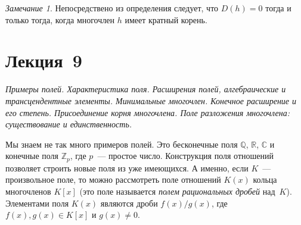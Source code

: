 \documentclass[a4paper,10pt]{amsart}
\def\CC{{\mathbb C}}%
\def\ZZ{{\mathbb Z}}%
\def\RR{{\mathbb R}}%
\def\QQ{{\mathbb Q}}%
\theoremstyle{definition}
\theoremstyle{remark}
\newtheorem{remark}{Замечание}
\newtheorem{example}{Пример}
\begin{document}
\begin{remark}
	Непосредствено из определения следует, что $D(h) = 0$ тогда и только
	тогда, когда многочлен $h$ имеет кратный корень.
\end{remark}
%
%
%
%
%


\newpage

\section*{Лекция~9}

\medskip

{\it Примеры полей. Характеристика поля. Расширения полей,
	алгебраические и трансцендентные элементы. Минимальные многочлен.
	Конечное расширение и его степень. Присоединение корня многочлена.
	Поле разложения многочлена: существование и единственность.}

\medskip

Мы знаем не так много примеров полей. Это бесконечные поля $\QQ$,
$\RR$, $\CC$ и конечные поля $\ZZ_p$, где $p$~--- простое число.
Конструкция поля отношений позволяет строить новые поля из уже
имеющихся. А именно, если $K$~--- произвольное поле, то можно
рассмотреть поле отношений $K(x)$ кольца многочленов $K[x]$ (это
поле называется \textit{полем рациональных дробей} над~$K$).
Элементами поля $K(x)$ являются дроби $f(x)/g(x)$, где $f(x), g(x)
\in K[x]$ и $g(x) \ne 0$.
\end{document}
